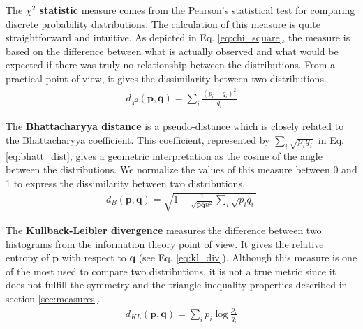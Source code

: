 The \textbf{$\chi^2$ statistic} measure comes from the Pearson's statistical test for comparing discrete probability distributions. The calculation of this measure is quite straightforward and intuitive. As depicted in Eq. \ref{eq:chi_square}, the measure is based on the difference between what is actually observed and what would be expected if there was truly no relationship between the distributions. From a practical point of view, it gives the dissimilarity between two distributions.
\begin{eqnarray}
d_{\chi^2}(\mathbf{p},\mathbf{q}) = \sum\nolimits_i \frac{(p_i - q_i)^2}{q_i} \label{eq:chi_square}
\end{eqnarray}


The \textbf{Bhattacharyya distance} \citep{Bhattacharyya:IJS:1946} is a pseudo-distance which is closely related to the Bhattacharyya coefficient. This coefficient, represented by $\sum_i\sqrt{p_{i}q_{i}}$ in Eq. \ref{eq:bhatt_dist}, gives a geometric interpretation as the cosine of the angle between the distributions. We normalize the values of this measure between 0 and 1 to express the dissimilarity between two distributions.
\begin{eqnarray}
d_{B}(\mathbf{p}, \mathbf{q}) = \sqrt{1- \frac{1}{\sqrt{\overline{\mathbf{p}} \overline{\mathbf{q}} n^2}} \sum\nolimits_{i} \sqrt{p_i q_i}} \label{eq:bhatt_dist}
\end{eqnarray}

The \textbf{Kullback-Leibler divergence} \citep{Kullback.Leibler:IMS:1951}  measures the difference between two histograms from the information theory point of view. It gives the relative entropy of $\mathbf{p}$ with respect to $\mathbf{q}$ (see Eq. \ref{eq:kl_div}). Although this measure is one of the most used to compare two distributions, it is not a true metric since it does not fulfill the symmetry and the triangle inequality properties described in section \ref{sec:measures}.
\begin{eqnarray}
d_{KL}(\mathbf{p}, \mathbf{q}) = \sum\nolimits_{i}p_i \log\frac{p_i}{q_i} \label{eq:kl_div}
\end{eqnarray}

